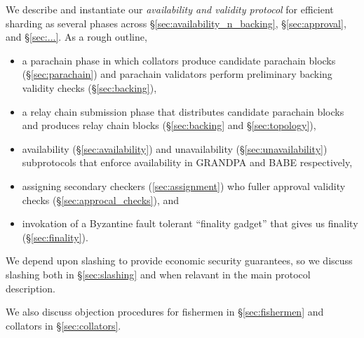 We describe and instantiate our {\em availability and validity protocol} for efficient sharding as several phases across \S\ref{sec:availability_n_backing}, \S\ref{sec:approval}, and \S\ref{sec:...}.  As a rough outline,
\begin{itemize}
\item a parachain phase in which collators produce candidate parachain blocks (\S\ref{sec:parachain}) and parachain validators perform preliminary backing validity checks (\S\ref{sec:backing}),
\item a relay chain submission phase that distributes candidate parachain blocks and produces relay chain blocks (\S\ref{sec:backing} and \S\ref{sec:topology}),
\item availability (\S\ref{sec:availability}) and unavailability (\S\ref{sec:unavailability}) subprotocols that enforce availability in GRANDPA and BABE respectively,
\item assigning secondary checkers (\ref{sec:assignment}) who fuller approval validity checks (\S\ref{sec:approcal_checks}), and
\item invokation of a Byzantine fault tolerant ``finality gadget'' that gives us finality (\S\ref{sec:finality}).
\end{itemize}
We depend upon slashing to provide economic security guarantees, so we discuss slashing both in \S\ref{sec:slashing} and when relavant in the main protocol description.

We also discuss objection procedures for fishermen in \S\ref{sec:fishermen} and collators in \S\ref{sec:collators}.


